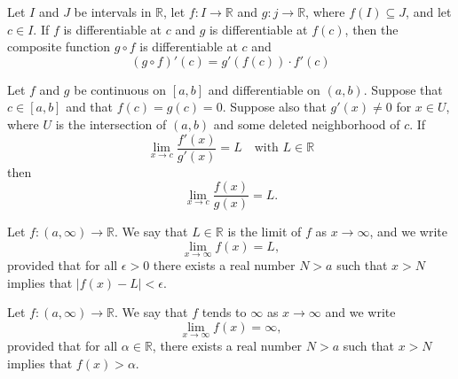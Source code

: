 \documentclass[nobib,notoc]{tufte-handout}
\begin{document}
\begin{thm}
	Let \(I\) and \(J\) be intervals in \(\mathbb{R}\), let \(f:I\rightarrow\mathbb{R}\) and \(g:j\rightarrow\mathbb{R}\), where \(f(I)\subseteq J\), and let \(c\in I\). If \(f\) is differentiable at \(c\) and \(g\) is differentiable at \(f(c)\), then the composite function \(g\circ f\) is differentiable at \(c\) and
	\begin{equation*}
		(g\circ f)'(c)=g'(f(c))\cdot f'(c)
	\end{equation*}
\end{thm}
\begin{thm}
	Let \(f\) and \(g\) be continuous on \([a,b]\) and differentiable on \((a,b)\). Suppose that \(c\in[a,b]\) and that \(f(c)=g(c)=0\). Suppose also that \(g'(x)\neq 0\) for \(x\in U\), where \(U\) is the intersection of \((a,b)\) and some deleted neighborhood of \(c\). If
	\begin{equation*}
		\lim_{x\rightarrow c}\frac{f'(x)}{g'(x)}=L\quad\text{with }L\in\mathbb{R}
	\end{equation*}
	then
	\begin{equation*}
		\lim_{x\rightarrow c}\frac{f(x)}{g(x)}=L.
	\end{equation*}
\end{thm}
\begin{defi}[limit]
	Let \(f:(a,\infty)\rightarrow\mathbb{R}\). We say that \(L\in\mathbb{R}\) is the limit of \(f\) as \(x\rightarrow\infty\), and we write
	\begin{equation*}
		\lim_{x\rightarrow\infty}f(x)=L,
	\end{equation*}
	provided that for all \(\epsilon>0\) there exists a real number \(N>a\) such that \(x>N\) implies that \(\lvert f(x)-L\rvert<\epsilon\).
\end{defi}
\begin{defi}
	Let \(f:(a,\infty)\rightarrow\mathbb{R}\). We say that \(f\) tends to \(\infty\) as \(x\rightarrow\infty\) and we write
	\begin{equation*}
		\lim_{x\rightarrow\infty}f(x)=\infty,
	\end{equation*}
	provided that for all \(\alpha\in\mathbb{R}\), there exists a real number \(N>a\) such that \(x>N\) implies that \(f(x)>\alpha\).
\end{defi}
\begin{thm}
\end{thm}
\begin{thm}
\end{thm}
\end{document}
